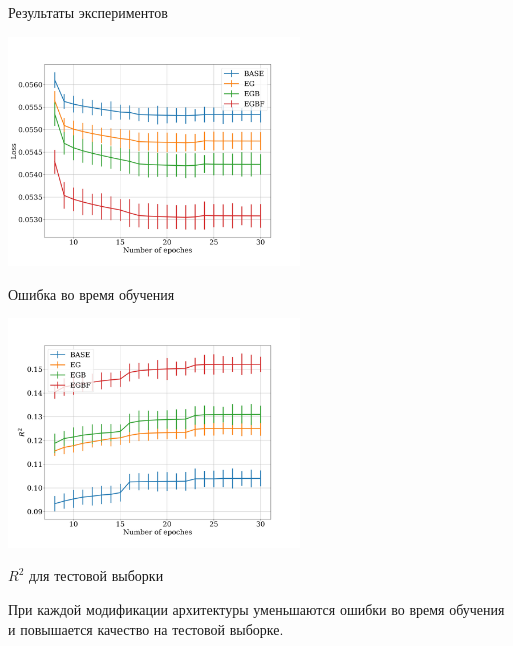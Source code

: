 \documentclass[11pt,pdf,hyperref={unicode}]{beamer}
\begin{document}
\begin{frame}{Результаты экспериментов}

\begin{multicols}
\normalsize
\includegraphics[width=0.58\textwidth]{com_graph(2).jpg}
\centering
\caption{\footnotesize{Ошибка во время обучения}}
\columnbreak

\includegraphics[width=0.58\textwidth]{com_graph_r2(2).jpg}
\centering
\caption{\footnotesize{$R^2$ для тестовой выборки}}
\end{multicols}

При каждой модификации архитектуры уменьшаются ошибки во время обучения и повышается качество на тестовой выборке.

\end{frame}
\end{document}
